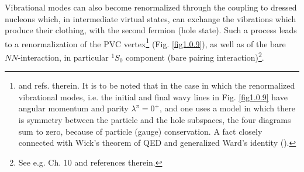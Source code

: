 Vibrational modes can also become renormalized through the coupling to dressed nucleons which, in intermediate virtual states, can exchange the vibrations which produce their clothing, with the second fermion (hole state). Such a process leads to a renormalization of the PVC vertex\footnote{\label{footnote7} \cite{Bertsch:83,Barranco:04} and refs. therein. It is to be noted that in the case in which the renormalized vibrational modes, i.e. the initial and final wavy lines in Fig. \ref{fig1.0.9} have angular momentum and parity $\lambda^\pi=0^+$, and one uses a model in which there is symmetry between the particle and the hole subspaces, the four diagrams sum to zero, because of particle (gauge) conservation. A fact closely connected with Wick's theorem of QED and generalized Ward's identity (\cite{Ward:50}).} (Fig. \ref{fig1.0.9}), as well as of the bare $NN$-interaction, in particular $^1S_0$ component (bare pairing interaction)\footnote{See e.g. \cite{Brink:05} Ch. 10 and references therein.}. 

